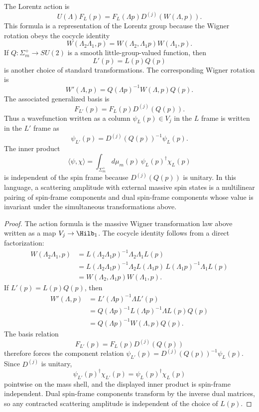 \begin{lemma}
\label{lem:massive-wigner-cocycle-spin-frame-change}
The Lorentz action is
\[
  U(\Lambda)F_L(p)
  =
  F_L(\Lambda p)D^{(j)}(W(\Lambda,p)).
\]
This formula is a representation of the Lorentz group because the Wigner
rotation obeys the cocycle identity
\[
  W(\Lambda_2\Lambda_1,p)
  =
  W(\Lambda_2,\Lambda_1 p)W(\Lambda_1,p).
\]
If \(Q:\Sigma_m^+\to SU(2)\) is a smooth little-group-valued function, then
\[
  L'(p)=L(p)Q(p)
\]
is another choice of standard transformations. The corresponding Wigner
rotation is
\[
  W'(\Lambda,p)
  =
  Q(\Lambda p)^{-1}W(\Lambda,p)Q(p).
\]
The associated generalized basis is
\[
  F_{L'}(p)=F_L(p)D^{(j)}(Q(p)).
\]
Thus a wavefunction written as a column \(\psi_L(p)\in V_j\) in the \(L\)
frame is written in the \(L'\) frame as
\[
  \psi_{L'}(p)=D^{(j)}(Q(p))^{-1}\psi_L(p).
\]
The inner product
\[
  \langle \psi,\chi\rangle
  =
  \int_{\Sigma_m^+} d\mu_m(p)\,
  \psi_L(p)^\dagger\chi_L(p)
\]
is independent of the spin frame because \(D^{(j)}(Q(p))\) is unitary. In this
language, a scattering amplitude with external massive spin states is a
multilinear pairing of spin-frame components and dual spin-frame components
whose value is invariant under the simultaneous transformations above.
\end{lemma}

\begin{proof}
The action formula is the massive Wigner transformation law above written as a
map \(V_j\to\Hilb_1\). The cocycle identity follows from a direct
factorization:
\[
\begin{aligned}
  W(\Lambda_2\Lambda_1,p)
  &=
  L(\Lambda_2\Lambda_1p)^{-1}\Lambda_2\Lambda_1L(p)\\
  &=
  L(\Lambda_2\Lambda_1p)^{-1}\Lambda_2L(\Lambda_1p)\,
  L(\Lambda_1p)^{-1}\Lambda_1L(p)\\
  &=
  W(\Lambda_2,\Lambda_1p)W(\Lambda_1,p).
\end{aligned}
\]
If \(L'(p)=L(p)Q(p)\), then
\[
\begin{aligned}
  W'(\Lambda,p)
  &=
  L'(\Lambda p)^{-1}\Lambda L'(p)\\
  &=
  Q(\Lambda p)^{-1}L(\Lambda p)^{-1}\Lambda L(p)Q(p)\\
  &=
  Q(\Lambda p)^{-1}W(\Lambda,p)Q(p).
\end{aligned}
\]
The basis relation
\[
  F_{L'}(p)=F_L(p)D^{(j)}(Q(p))
\]
therefore forces the component relation
\(\psi_{L'}(p)=D^{(j)}(Q(p))^{-1}\psi_L(p)\).  Since \(D^{(j)}\) is unitary,
\[
  \psi_{L'}(p)^\dagger\chi_{L'}(p)
  =
  \psi_L(p)^\dagger\chi_L(p)
\]
pointwise on the mass shell, and the displayed inner product is
spin-frame independent.  Dual spin-frame components transform by the inverse
dual matrices, so any contracted scattering amplitude is independent of the
choice of \(L(p)\).
\end{proof}

